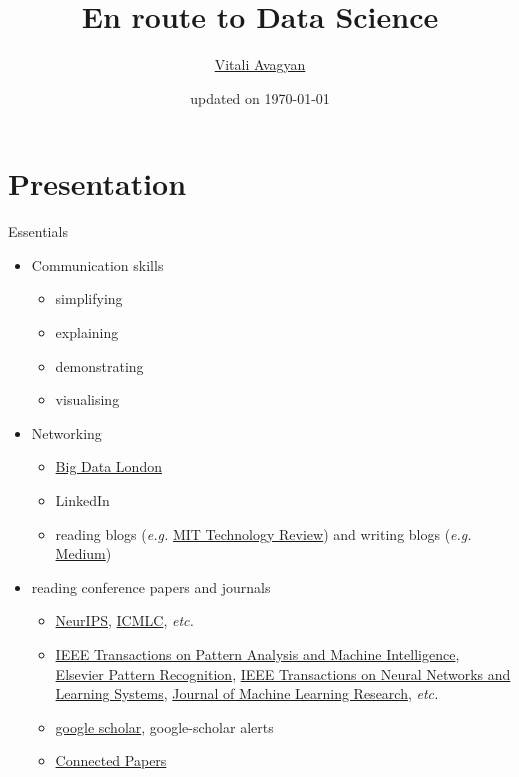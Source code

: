 \documentclass[compress,brown]{beamer}
\title{En route to Data Science}
\author{\href{https://www.linkedin.com/in/vitali-avagyan-a1566234/}{Vitali Avagyan}}
\institute{Data Scientist \\TurinTech \\London, UK}
\date{updated on \today}
\begin{document}
	\frame{
		\titlepage 
	}

\section{Presentation}

\begin{frame}{Essentials}
	\begin{itemize}
		\item Communication skills
			\begin{itemize}
				\item simplifying
				\item explaining
				\item demonstrating		
				\item visualising	
			\end{itemize}
		\item Networking
			\begin{itemize}
				\item \href{https://bigdataldn.com/}{Big Data London}
				\item LinkedIn
				\item reading blogs (\textit{e.g.} \href{https://www.technologyreview.com/}{MIT Technology Review}) and writing blogs (\textit{e.g.} \href{https://medium.com/}{Medium}) 			
			\end{itemize}
		\item reading conference papers and journals
			\begin{itemize}
				\item \href{https://nips.cc/}{NeurIPS}, \href{http://www.icmlc.org/}{ICMLC}, \textit{etc.}
				\item \href{https://ieeexplore.ieee.org/xpl/RecentIssue.jsp?punumber=34}{IEEE Transactions on Pattern Analysis and Machine Intelligence}, \href{https://www.sciencedirect.com/journal/pattern-recognition}{Elsevier Pattern Recognition}, \href{https://www.scimagojr.com/journalsearch.php?q=21100235616&tip=sid&clean=0}{IEEE Transactions on Neural Networks and Learning Systems}, \href{https://www.jmlr.org/}{Journal of Machine Learning Research}, \textit{etc.}
				\item \href{https://scholar.google.com/}{google scholar}, google-scholar alerts
				\item \href{https://www.connectedpapers.com/}{Connected Papers} 				
			\end{itemize}				
	\end{itemize}	
\end{frame}
\end{document}
